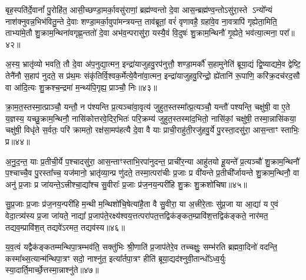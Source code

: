 {\anuvakamend[{म॒नु॒ष्य॒च॒रावु॑दपा॒त्रमु॑प॒ह्वये॑त द्विदेव॒त्याः᳚ षट्च॑त्वारिꣳशच्च॥९॥}]}

बृह॒स्पति॑र्दे॒वानां᳚ पु॒रोहि॑त॒ आसी॒च्छण्डा॒मर्का॒वसु॑राणां॒ ब्रह्म॑ण्वन्तो दे॒वा आस॒न्ब्रह्म॑ण्व॒न्तो\-ऽसु॑रा॒स्ते \-ऽन्यो᳚न्यं नाश॑क्नुवन्न॒भिभ॑वितु॒न्ते दे॒वाः शण्डा॒मर्का॒वुपा॑मन्त्रयन्त॒ ताव॑ब्रूतां॒ वरं॑ वृणावहै॒ ग्रहा॑वे॒व ना॒वत्रापि॑ गृह्येता॒मिति॒ ताभ्या॑मे॒तौ शु॒क्राम॒न्थिना॑वगृह्ण॒न्ततो॑ दे॒वा अभ॑व॒न्परासु॑रा॒ यस्यै॒वं वि॒दुषः॑ शु॒क्राम॒न्थिनौ॑ गृ॒ह्येते॒ भव॑त्या॒त्मना॒ परा᳚॥४२॥

अ॒स्य॒ भ्रातृ॑व्यो भवति॒ तौ दे॒वा अ॑प॒नुद्या॒त्मन॒ इन्द्रा॑याजुहवु॒रप॑नुत्तौ॒ शण्डा॒मर्कौ॑ स॒हामुनेति॑ ब्रूया॒द्यं द्वि॒ष्याद्यमे॒व द्वेष्टि॒ तेनै॑नौ स॒हाप॑ नुदते॒ स प्र॑थ॒मः संकृ॑तिर्वि॒श्वक॒र्मेत्ये॒वैना॑वा॒त्मन॒ इन्द्रा॑याजुहवु॒रिन्द्रो॒ ह्ये॑तानि॑ रू॒पाणि॒ करि॑क्र॒दच॑रद॒सौ वा आ॑दि॒त्यः शु॒क्रश्च॒न्द्रमा॑ म॒न्थ्य॑पि॒गृह्य॒ प्राञ्चौ॒ निः॥४३॥

क्रा॒म॒त॒स्तस्मा॒त्प्राञ्चौ॒ यन्तौ॒ न प॑श्यन्ति प्र॒त्यञ्चा॑वा॒वृत्य॑ जुहुत॒स्तस्मा᳚त्प्र॒त्यञ्चौ॒ यन्तौ॑ पश्यन्ति॒ चक्षु॑षी॒ वा ए॒ते य॒ज्ञस्य॒ यच्छु॒क्राम॒न्थिनौ॒ नासि॑कोत्तरवे॒दिर॒भितः॑ परि॒क्रम्य॑ जुहुत॒स्तस्मा॑द॒भितो॒ नासि॑कां॒ चक्षु॑षी॒ तस्मा॒न्नासि॑कया॒ चक्षु॑षी॒ विधृ॑ते स॒र्वतः॒ परि॑ क्रामतो॒ रक्ष॑सा॒मप॑हत्यै दे॒वा वै याः प्राची॒राहु॑ती॒रजु॑हवु॒र्ये पु॒रस्ता॒दसु॑रा॒ आस॒न्ताꣳ स्ताभिः॒ प्र॥४४॥

अ॒नु॒द॒न्त॒ याः प्र॒तीची॒र्ये प॒श्चादसु॑रा॒ आस॒न्ताꣳस्ताभि॒रपा॑नुदन्त॒ प्राची॑र॒न्या आहु॑तयो हू॒यन्ते᳚ प्र॒त्यञ्चौ॑ शु॒क्राम॒न्थिनौ॑ प॒श्चाच्चै॒व पु॒रस्ता᳚च्च॒ यज॑मानो॒ भ्रातृ॑व्या॒न्प्र णु॑दते॒ तस्मा॒त्परा॑चीः प्र॒जाः प्र वी॑यन्ते प्र॒तीची᳚र्जायन्ते शु॒क्राम॒न्थिनौ॒ वा अनु॑ प्र॒जाः प्र जा॑यन्ते॒\-ऽत्त्रीश्चा॒द्या᳚श्च सु॒वीराः᳚ प्र॒जाः प्र॑ज॒नय॒न्परी॑हि शु॒क्रः शु॒क्रशो॑चिषा॥४५॥

सु॒प्र॒जाः प्र॒जाः प्र॑ज॒नय॒न्परी॑हि म॒न्थी म॒न्थिशो॑चि॒षेत्या॑है॒ता वै सु॒वीरा॒ या अ॒त्त्रीरे॒ताः सु॑प्र॒जा या आ॒द्या॑ य ए॒वं वेदा॒त्त्र्य॑स्य प्र॒जा जा॑यते॒ नाद्या᳚ प्र॒जाप॑ते॒रक्ष्य॑श्वय॒त्तत्परा॑पत॒त्तद्विक॑ङ्कत॒म्प्रावि॑श॒त्तद्विक॑ङ्कते॒ नार॑मत॒ तद्यव॒म्प्रावि॑श॒त् तद्यवे॑\-ऽरमत॒ तद्यव॑स्य॥४६॥

य॒व॒त्वं यद्वैक॑ङ्कतम्मन्थिपा॒त्रम्भव॑ति॒ सक्तु॑भिः श्री॒णाति॑ प्र॒जाप॑तेरे॒व तच्चक्षुः॒ सम्भ॑रति ब्रह्मवा॒दिनो॑ वदन्ति॒ कस्मा᳚थ्स॒त्यान्म॑न्थिपा॒त्रꣳ सदो॒ नाश्नु॑त॒ इत्या᳚र्तपा॒त्रꣳ हीति॑ ब्रूया॒द्यद॑श्नुवी॒तान्धो᳚\-ऽध्व॒र्युः स्या॒दार्ति॒मार्च्छे॒त्तस्मा॒न्नाश्नु॑ते॥४७॥

{\anuvakamend[{आ॒त्मना॒ परा॒ निष्प्र शु॒क्रशो॑चिषा॒ यव॑स्य स॒प्तत्रिꣳ॑शच्च॥10॥}]}

